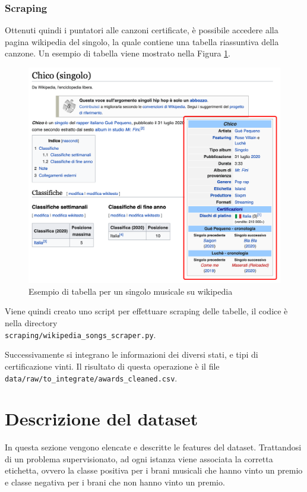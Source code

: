 \subsubsection{Scraping}
Ottenuti quindi i puntatori alle canzoni certificate, è possibile accedere alla pagina wikipedia del singolo, la quale contiene una tabella riassuntiva della canzone. Un esempio di tabella viene mostrato nella Figura \ref{fig:wiki_table}.
\begin{figure}[H]
	\centering
	\includegraphics[width=12cm]{assets/wikipedia-table.png}
	\caption{Esempio di tabella per un singolo musicale su wikipedia}
	\label{fig:wiki_table}
\end{figure}

Viene quindi creato uno script per effettuare scraping delle tabelle, il codice è nella directory\\ \verb|scraping/wikipedia_songs_scraper.py|.

Successivamente si integrano le informazioni dei diversi stati, e tipi di certificazione vinti. Il risultato di questa operazione è il file \verb|data/raw/to_integrate/awards_cleaned.csv|.

\section{Descrizione del dataset}
In questa sezione vengono elencate e descritte le features del
dataset. Trattandosi di un problema supervisionato, ad ogni istanza
viene associata la corretta etichetta, ovvero la classe positiva per i
brani musicali che hanno vinto un premio e classe negativa per i brani
che non hanno vinto un premio.
